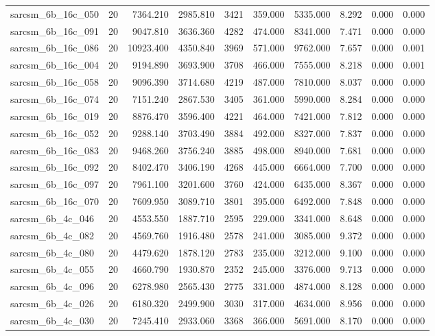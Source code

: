 \begin{tabular}{lrrrrrrrrr}
sarcsm\_6b\_16c\_050 & 20 & 7364.210 & 2985.810 & 3421 & 359.000 & 5335.000 & 8.292 & 0.000 & 0.000 \\
sarcsm\_6b\_16c\_091 & 20 & 9047.810 & 3636.360 & 4282 & 474.000 & 8341.000 & 7.471 & 0.000 & 0.000 \\
sarcsm\_6b\_16c\_086 & 20 & 10923.400 & 4350.840 & 3969 & 571.000 & 9762.000 & 7.657 & 0.000 & 0.001 \\
sarcsm\_6b\_16c\_004 & 20 & 9194.890 & 3693.900 & 3708 & 466.000 & 7555.000 & 8.218 & 0.000 & 0.001 \\
sarcsm\_6b\_16c\_058 & 20 & 9096.390 & 3714.680 & 4219 & 487.000 & 7810.000 & 8.037 & 0.000 & 0.000 \\
sarcsm\_6b\_16c\_074 & 20 & 7151.240 & 2867.530 & 3405 & 361.000 & 5990.000 & 8.284 & 0.000 & 0.000 \\
sarcsm\_6b\_16c\_019 & 20 & 8876.470 & 3596.400 & 4221 & 464.000 & 7421.000 & 7.812 & 0.000 & 0.000 \\
sarcsm\_6b\_16c\_052 & 20 & 9288.140 & 3703.490 & 3884 & 492.000 & 8327.000 & 7.837 & 0.000 & 0.000 \\
sarcsm\_6b\_16c\_083 & 20 & 9468.260 & 3756.240 & 3885 & 498.000 & 8940.000 & 7.681 & 0.000 & 0.000 \\
sarcsm\_6b\_16c\_092 & 20 & 8402.470 & 3406.190 & 4268 & 445.000 & 6664.000 & 7.700 & 0.000 & 0.000 \\
sarcsm\_6b\_16c\_097 & 20 & 7961.100 & 3201.600 & 3760 & 424.000 & 6435.000 & 8.367 & 0.000 & 0.000 \\
sarcsm\_6b\_16c\_070 & 20 & 7609.950 & 3089.710 & 3801 & 395.000 & 6492.000 & 7.848 & 0.000 & 0.000 \\
sarcsm\_6b\_4c\_046 & 20 & 4553.550 & 1887.710 & 2595 & 229.000 & 3341.000 & 8.648 & 0.000 & 0.000 \\
sarcsm\_6b\_4c\_082 & 20 & 4569.760 & 1916.480 & 2578 & 241.000 & 3085.000 & 9.372 & 0.000 & 0.000 \\
sarcsm\_6b\_4c\_080 & 20 & 4479.620 & 1878.120 & 2783 & 235.000 & 3212.000 & 9.100 & 0.000 & 0.000 \\
sarcsm\_6b\_4c\_055 & 20 & 4660.790 & 1930.870 & 2352 & 245.000 & 3376.000 & 9.713 & 0.000 & 0.000 \\
sarcsm\_6b\_4c\_096 & 20 & 6278.980 & 2565.430 & 2775 & 331.000 & 4874.000 & 8.128 & 0.000 & 0.000 \\
sarcsm\_6b\_4c\_026 & 20 & 6180.320 & 2499.900 & 3030 & 317.000 & 4634.000 & 8.956 & 0.000 & 0.000 \\
sarcsm\_6b\_4c\_030 & 20 & 7245.410 & 2933.060 & 3368 & 366.000 & 5691.000 & 8.170 & 0.000 & 0.000 \\

\end{tabular}
